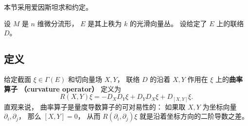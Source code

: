 

本节采用爱因斯坦求和约定。

设 $M$ 是 $n$ 维微分流形， $E$ 是其上秩为 $k$ 的光滑向量丛。 设给定了 $E$ 上的联络 $D$。

\subsection{定义}

给定截面 $\xi\in\Gamma(E)$ 和切向量场 $X,Y$， 联络 $D$ 的沿着 $X,Y$ 作用在 $\xi$ 上的\textbf{曲率算子 （curvature operator）} 定义为
$$
R(X,Y)\xi=-D_XD_Y\xi+D_YD_X\xi+D_{[X,Y]}\xi.
$$
直观来说， 曲率算子是量度导数算子的可对易性的： 如果取 $X,Y$ 为坐标向量 $\partial_i,\partial_j$， 那么 $[X,Y]=0$， 从而 $R(\partial_i,\partial_j)\xi$ 就是沿着坐标方向的二阶导数之差。

